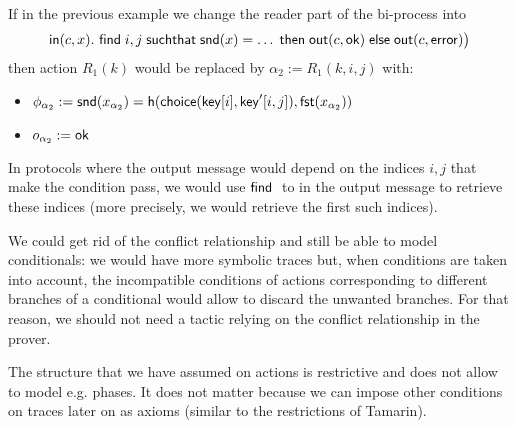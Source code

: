 \begin{example}
  If in the previous example we change the reader part of the bi-process into
  $$\textsf{in}(c,x).~ \textsf{find}\; i,j \;\textsf{suchthat}\; \mathsf{snd}(x) = \ldots \;\textsf{then}\;
  \textsf{out}(c,\mathsf{ok}) \;\textsf{else}\; \textsf{out}(c,\mathsf{error})\bigr)$$
  then action $R_1(k)$ would be replaced by $\alpha_2 := R_1(k,i,j)$
  with:
  \begin{itemize}
    \item $\phi_{\alpha_2} := \mathsf{snd}(x_{\alpha_2}) =  
      \mathsf{h}(\mathsf{choice}(\mathsf{key}[i],\mathsf{key}'[i,j]),\mathsf{fst}(x_{\alpha_2}))$
    \item $o_{\alpha_2} := \mathsf{ok}$
  \end{itemize}
  In protocols where the output message would depend on the indices $i,j$
  that make the condition pass, we would use $\textsf{find}\;$ to in the
  output message to retrieve these indices (more precisely, we would retrieve
  the first such indices).
\end{example}

\bigskip
\noindent
\begin{remark}
  We could get rid of the conflict relationship and still be able to
  model conditionals: we would have more symbolic traces but, when conditions
  are taken into account, the incompatible conditions of actions corresponding
  to different branches of a conditional would allow to discard
  the unwanted branches. For that reason, we should not need a tactic
  relying on the conflict relationship in the prover.
\end{remark}

\begin{remark}
  The structure that we have assumed on actions is restrictive and
  does not allow to model e.g. phases. It does not matter because we can
  impose other conditions on traces later on as axioms (similar to the
  restrictions of Tamarin).
\end{remark}
